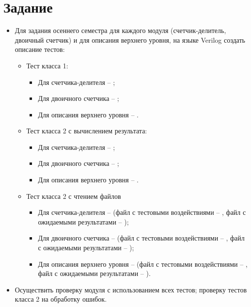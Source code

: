 





\tableofcontents
\lstlistoflistings
\listoffigures
\newpage

\section{Задание}

\begin{itemize}
	\item Для задания  осеннего семестра для каждого модуля (счетчик-делитель, двоичный счетчик) и для описания верхнего уровня, на языке Verilog создать описание тестов:
		\begin{itemize}
			\item Тест класса 1:
				\begin{itemize}
					\item Для счетчика-делителя -- ;
					\item Для двоичного счетчика -- ;
					\item Для описания верхнего уровня -- .
				\end{itemize}
			\item Тест класса 2 с вычислением результата:
				\begin{itemize}
					\item Для счетчика-делителя -- ;
					\item Для двоичного счетчика -- ;
					\item Для описания верхнего уровня -- .
				\end{itemize}
			\item Тест класса 2 с чтением файлов
				\begin{itemize}
					\item Для счетчика-делителя --  (файл с тестовыми воздействиями -- , файл с ожидаемыми результатами -- );
					\item Для двоичного счетчика --  (файл с тестовыми воздействиями -- , файл с ожидаемыми результатами -- );
					\item Для описания верхнего уровня --  (файл с тестовыми воздействиями -- , файл с ожидаемыми результатами -- ).
				\end{itemize}
		\end{itemize}

	\item Осуществить проверку модуля с использованием всех тестов; проверку тестов класса 2 на обработку ошибок.
\end{itemize}

